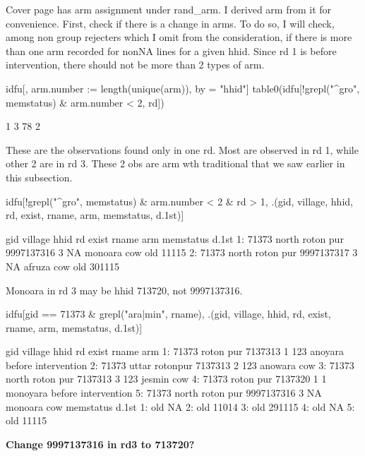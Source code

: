 Cover page has arm assignment under \textsf{rand\_arm}. I derived \textsf{arm} from it for convenience. First, check if there is a change in arms. To do so, I will check, among non group rejecters which I omit from the consideration, if there is more than one arm recorded for nonNA lines for a given hhid. Since rd 1 is before intervention, there should not be more than 2 types of \textsf{arm}.
\begin{Schunk}
\begin{Sinput}
idfu[, arm.number := length(unique(arm)), by = "hhid"]
table0(idfu[!grepl("^gro", memstatus) & arm.number < 2, rd])
\end{Sinput}
\begin{Soutput}

 1  3 
78  2 
\end{Soutput}
\end{Schunk}
These are the observations found only in one rd. Most are observed in rd 1, while other 2 are in rd 3. These 2 obs are \textsf{arm} wth traditional that we saw earlier in this subsection.
\begin{Schunk}
\begin{Sinput}
idfu[!grepl("^gro", memstatus) & arm.number < 2 & rd > 1, 
	.(gid, village, hhid, rd, exist, rname, arm, memstatus, d.1st)]
\end{Sinput}
\begin{Soutput}
     gid         village       hhid rd exist   rname arm memstatus  d.1st
1: 71373 north roton pur 9997137316  3    NA monoara cow       old  11115
2: 71373 north roton pur 9997137317  3    NA  afruza cow       old 301115
\end{Soutput}
\end{Schunk}
Monoara in rd 3 may be \textsf{hhid} 713720, not 9997137316.
\begin{Schunk}
\begin{Sinput}
idfu[gid == 71373 & grepl("ara|min", rname), 
	.(gid, village, hhid, rd, exist, rname, arm, memstatus, d.1st)]
\end{Sinput}
\begin{Soutput}
     gid         village       hhid rd exist    rname                 arm
1: 71373       roton pur    7137313  1   123  anoyara before intervention
2: 71373  uttar rotonpur    7137313  2   123  anowara                 cow
3: 71373 north roton pur    7137313  3   123   jesmin                 cow
4: 71373       roton pur    7137320  1     1 monoyara before intervention
5: 71373 north roton pur 9997137316  3    NA  monoara                 cow
   memstatus  d.1st
1:       old     NA
2:       old  11014
3:       old 291115
4:       old     NA
5:       old  11115
\end{Soutput}
\end{Schunk}
\textbf{Change 9997137316 in rd3 to 713720?}

